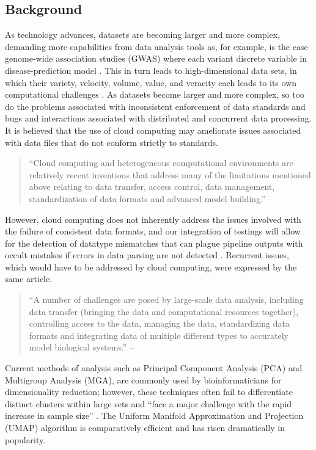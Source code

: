\documentclass[10pt,letterpaper]{article}
\begin{document}
\begin{multicols}{2}
\section{Background}

As technology advances, datasets are becoming larger and more complex,
demanding more capabilities from data analysis tools as, for example,
is the case genome-wide association studies (GWAS) where each variant
discrete variable in disease-prediction model
\parencite{huang2018high}. This in turn leads to high-dimensional data
sets, in which their variety, velocity, volume, value, and veracity
each leads to its own computational challenges
\parencite{anuradha2015brief}. As datasets become larger and more
complex, so too do the problems associated with inconsistent
enforcement of data standards and bugs and interactions associated
with distributed and concurrent data processing. It is believed that
the use of cloud computing may ameliorate issues associated with data
files that do not conform strictly to standards.

\begin{quote}
  ``Cloud computing and heterogeneous computational environments are relatively recent inventions that address many of the limitations mentioned above relating to data transfer, access control, data management, standardization of data formats and advanced model building.'' --~\cite{Schadt_2010}
\end{quote}

However, cloud computing does not inherently address the issues
involved with the failure of consistent data formats, and our
integration of testings will allow for the detection of datatype
mismatches that can plague pipeline outputs with occult mistakes if
errors in data parsing are not detected
\parencite{natella2018analyzing}. Recurrent issues, which would have
to be addressed by cloud computing, were expressed by the same article.

\begin{quote}
``A number of challenges are posed by large-scale data analysis, including data transfer (bringing the data and computational resources together), controlling access to the data, managing the data, standardizing data formats and integrating data of multiple different types to accurately model biological systems.'' --~\cite{Schadt_2010}
\end{quote}

Current methods of analysis such as Principal Component Analysis (PCA)
and Multigroup Analysis (MGA), are commonly used by bioinformaticians
for dimensionality reduction; however, these techniques often fail to
differentiate distinct clusters within large sets and ``face a major
challenge with the rapid increase in sample size''
\parencite{yang2021dimensionality}. The Uniform Manifold Approximation
and Projection (UMAP) algorithm is comparatively efficient and has
risen dramatically in popularity.


\end{multicols}
\end{document}
